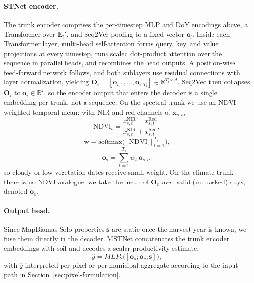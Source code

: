 \paragraph{STNet encoder.}
The trunk encoder comprises the per-timestep MLP and DoY encodings above, a Transformer over $\mathbf{E}_i'$, and Seq2Vec pooling to a fixed vector $\mathbf{o}_i$.
Inside each Transformer layer, multi-head self-attention forms query, key, and value projections at every timestep, runs scaled dot-product attention over the sequence in parallel heads, and recombines the head outputs.
A position-wise feed-forward network follows, and both sublayers use residual connections with layer normalization, yielding $\mathbf{O}_i=[\mathbf{o}_{i,1},\ldots,\mathbf{o}_{i,T_i}]\in\mathbb{R}^{T_i\times d}$.
Seq2Vec then collapses $\mathbf{O}_i$ to $\mathbf{o}_i\in\mathbb{R}^{d}$, so the encoder output that enters the decoder is a single embedding per trunk, not a sequence.
On the spectral trunk we use an NDVI-weighted temporal mean: with NIR and red channels of $\mathbf{x}_{s,t}$,
\begin{equation}
  \mathrm{NDVI}_t
  =
  \frac{x_{s,t}^{\mathrm{NIR}}-x_{s,t}^{\mathrm{Red}}}{x_{s,t}^{\mathrm{NIR}}+x_{s,t}^{\mathrm{Red}}},
  \label{eq:ndvi}
\end{equation}
\begin{equation}
  \mathbf{w}=\mathrm{softmax}\bigl([\mathrm{NDVI}_t]_{t=1}^{T_s}\bigr),
  \label{eq:ndvi-weights}
\end{equation}
\begin{equation}
  \mathbf{o}_s
  =
  \sum_{t=1}^{T_s} w_t\,\mathbf{o}_{s,t},
  \label{eq:ndvi-seq2vec}
\end{equation}
so cloudy or low-vegetation dates receive small weight.
On the climate trunk there is no NDVI analogue; we take the mean of $\mathbf{O}_c$ over valid (unmasked) days, denoted $\mathbf{o}_c$.

\paragraph{Output head.}
Since MapBiomas Solo properties $\mathbf{s}$ are static once the harvest year is known, we fuse them directly in the decoder.
MSTNet concatenates the trunk encoder embeddings with soil and decodes a scalar productivity estimate,
\begin{equation}
  \hat{y}
  =
  MLP_2\bigl([\mathbf{o}_s;\mathbf{o}_c;\mathbf{s}]\bigr),
  \label{eq:output-head}
\end{equation}
with $\hat{y}$ interpreted per pixel or per municipal aggregate according to the input path in Section~\ref{sec:pixel-formulation}.

